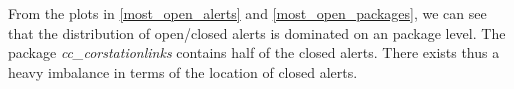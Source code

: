 From the plots in \cref{most_open_alerts} and \cref{most_open_packages}, we can see that the distribution of open/closed alerts is dominated on an package level. The package \textit{cc\_corstationlinks} contains half of the closed alerts. There exists thus a heavy imbalance in terms of the location of closed alerts.


%
%
%
